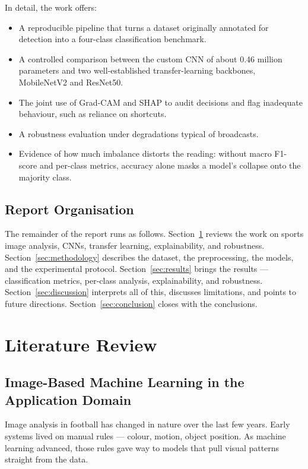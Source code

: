 \documentclass[preprint,12pt]{elsarticle}
\begin{document}
In detail, the work offers:
\begin{itemize}
    \item A reproducible pipeline that turns a dataset originally annotated for detection into a four-class classification benchmark.
    \item A controlled comparison between the custom CNN of about 0.46 million parameters and two well-established transfer-learning backbones, MobileNetV2 and ResNet50.
    \item The joint use of Grad-CAM and SHAP to audit decisions and flag inadequate behaviour, such as reliance on shortcuts.
    \item A robustness evaluation under degradations typical of broadcasts.
    \item Evidence of how much imbalance distorts the reading: without macro F1-score and per-class metrics, accuracy alone masks a model's collapse onto the majority class.
\end{itemize}

\subsection{Report Organisation}

The remainder of the report runs as follows. Section~\ref{sec:litreview} reviews the work on sports image analysis, CNNs, transfer learning, explainability, and robustness. Section~\ref{sec:methodology} describes the dataset, the preprocessing, the models, and the experimental protocol. Section~\ref{sec:results} brings the results --- classification metrics, per-class analysis, explainability, and robustness. Section~\ref{sec:discussion} interprets all of this, discusses limitations, and points to future directions. Section~\ref{sec:conclusion} closes with the conclusions.

\section{Literature Review}
\label{sec:litreview}

\subsection{Image-Based Machine Learning in the Application Domain}

Image analysis in football has changed in nature over the last few years. Early systems lived on manual rules --- colour, motion, object position. As machine learning advanced, those rules gave way to models that pull visual patterns straight from the data.
\end{document}
